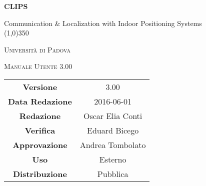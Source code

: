 \documentclass[a4paper,12pt]{article}
\author{Eduard Bicego}
\date{01/05/2016}
\begin{document}
\begin{titlepage}
	\centering
	{\huge\bfseries CLIPS\par}
	Communication \& Localization with Indoor Positioning Systems \\
	\line(1,0){350} \\
	{\scshape\LARGE Università di Padova \par}
	\vspace{1cm}
	{\scshape\Large Manuale Utente 3.00 \par}
	\logo
	\newpage
	\begin{tabular}{c|c}
		{\hfill \textbf{Versione}} 			& 3.00					\\
		{\hfill\textbf{Data Redazione}} 		& 2016-06-01  		\\
		{\hfill\textbf{Redazione}} 			& Oscar Elia Conti		\\
		{\hfill\textbf{Verifica}} 				&  Eduard Bicego	\\
		{\hfill\textbf{Approvazione}} 		& Andrea Tombolato		\\
		{\hfill\textbf{Uso}} 					& Esterno			\\
		{\hfill\textbf{Distribuzione}} 			& Pubblica 			\\
	\end{tabular}
\end{titlepage}


	
	\newpage
	\pagestyle{myfront}
	
		\newpage
			
		\newpage
			\tableofcontents
		\newpage
			\listoffigures
	\label{LastFrontPage}

	\newpage
		\pagestyle{mymain}
	\newpage
		
	\newpage
		
	\newpage
		
	\newpage
		
	\newpage
		
	\newpage
		
	
	
	\newpage
		\printglossary

		
	\label{LastPage}
\end{document}
